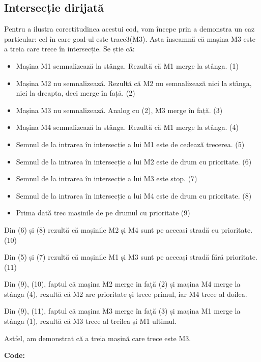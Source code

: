  \subsection{Intersecție dirijată}
 
 Pentru a ilustra corectitudinea acestui cod, vom începe prin a demonstra un caz particular: cel în care goal-ul este trace3(M3). Asta înseamnă că mașina M3 este a treia care trece în intersecție. Se știe că:
 
\begin{itemize}
    \setlength\itemsep{0em}
    \item Mașina M1 semnalizează la stânga. Rezultă că M1 merge la stânga. (1)
    \item Mașina M2 nu semnalizează. Rezultă că M2 nu semnalizează nici la stânga, nici la dreapta, deci merge în față. (2)
    \item Mașina M3 nu semnalizează. Analog cu (2), M3 merge în față. (3)
    \item Mașina M4 semnalizează la stânga. Rezultă că M1 merge la stânga. (4)
    \item Semnul de la intrarea în intersecție a lui M1 este de cedează trecerea. (5)
    \item Semnul de la intrarea în intersecție a lui M2 este de drum cu prioritate. (6)
    \item Semnul de la intrarea în intersecție a lui M3 este stop. (7)
    \item Semnul de la intrarea în intersecție a lui M4 este de drum cu prioritate. (8)
    \item Prima dată trec mașinile de pe drumul cu prioritate (9)
    
\end{itemize}

Din (6) și (8) rezultă că mașinile M2 și M4 sunt pe aceeasi stradă cu prioritate. (10)

Din (5) și (7) rezultă că mașinile M1 și M3 sunt pe aceeași stradă fără prioritate. (11)

Din (9), (10), faptul că mașina M2 merge in față (2) și mașina M4 merge la stânga (4), rezultă că M2 are prioritate și trece primul, iar M4 trece al doilea.

Din (9), (11), faptul că mașina M3 merge în față (3) și mașina M1 merge la stânga (1), rezultă că M3 trece al treilea și M1 ultimul. 

Astfel, am demonstrat că a treia mașină care trece este M3.

\textbf{Code:}

    \inputminted[linenos]{C}{cod/aut_dir.out}	